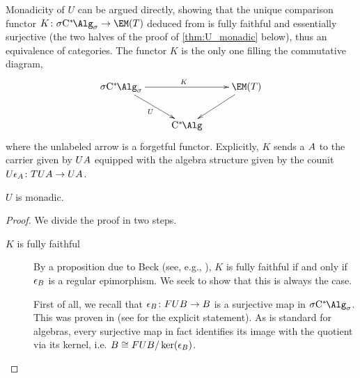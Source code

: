 Monadicity of $U$ can be argued directly, showing that the unique comparison functor $K\colon \SigmaC \to \EM(T)$ deduced from \cite[p. 222]{macdonald2003aspects} is fully faithful and essentially surjective (the two halves of the proof of \cref{thm:U_monadic} below), thus an equivalence of categories.
 The functor $K$ is the only one filling the commutative diagram,
\[
	\xymatrix{
		\SigmaC \ar[rr]^{K} \ar[dr]_{U} && \EM(T) \ar[dl] \\
		& \Calg
	}
\]
where the unlabeled arrow is a forgetful functor.
Explicitly, $K$ sends a \cstars{} ${A}$ to the carrier given by $U{A}$ equipped with the algebra structure given by the counit $U\epsilon_{{A}} \colon TU{A} \to U{A}$.
\begin{theorem}\label{thm:U_monadic}
	$U$ is monadic.
\end{theorem}
\begin{proof}
	We divide the proof in two steps.
	\begin{description}
		\item[{$K$ is fully faithful}]   By a proposition due to Beck (see, e.g., \cite[p.~226]{macdonald2003aspects}), $K$ is fully faithful if and only if $\epsilon_{{B}}$ is a regular epimorphism.
		      We seek to show that this is always the case.

		      First of all, we recall that $\epsilon_{{B}}\colon FU{B} \to {B}$ is a surjective map in $\SigmaC$.
		      This was proven in \cite[Theorem 5.4.5]{saito15monotone} (see \cite[Theorem 3.3.6]{fritz2025categories} for the explicit statement).
		      As is standard for algebras, every surjective map in fact identifies its image with the quotient via its kernel, i.e. ${B} \cong FU{B} / \ker(\epsilon_{{B}})$.


\end{description}
\end{proof}
